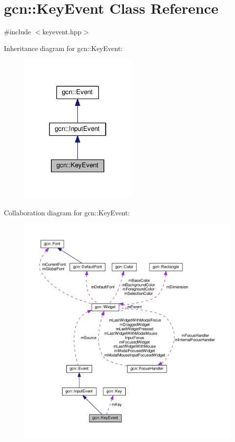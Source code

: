 \hypertarget{classgcn_1_1KeyEvent}{}\section{gcn\+:\+:Key\+Event Class Reference}
\label{classgcn_1_1KeyEvent}


{\ttfamily \#include $<$keyevent.\+hpp$>$}



Inheritance diagram for gcn\+:\+:Key\+Event\+:\nopagebreak
\begin{figure}[H]
\begin{center}
\leavevmode
\includegraphics[width=166pt]{classgcn_1_1KeyEvent__inherit__graph}
\end{center}
\end{figure}


Collaboration diagram for gcn\+:\+:Key\+Event\+:\nopagebreak
\begin{figure}[H]
\begin{center}
\leavevmode
\includegraphics[width=350pt]{classgcn_1_1KeyEvent__coll__graph}
\end{center}
\end{figure}
